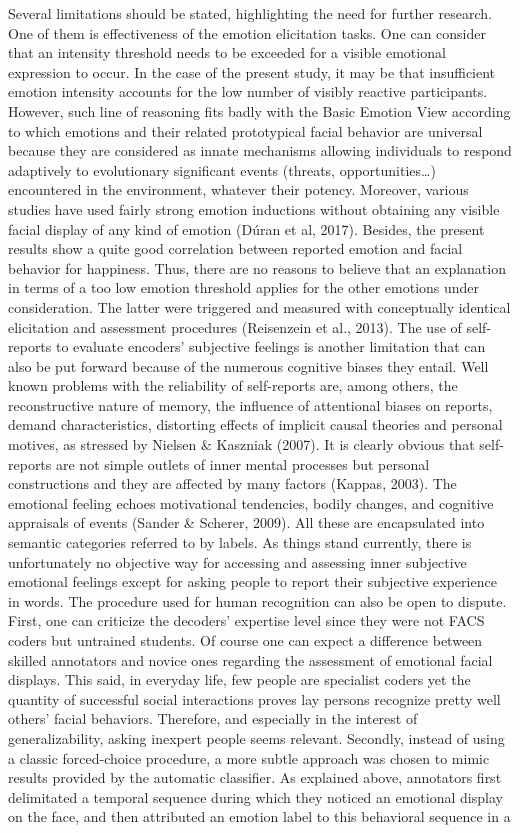 \documentclass[man]{apa6}
\begin{document}
Several limitations should be stated, highlighting the need for further research. One of them is effectiveness of the emotion elicitation tasks. One can consider that an intensity threshold needs to be exceeded for a visible emotional expression to occur. In the case of the present study, it may be that insufficient emotion intensity accounts for the low number of visibly reactive participants. However, such line of reasoning fits badly with the Basic Emotion View according to which emotions and their related prototypical facial behavior are universal because they are considered as innate mechanisms allowing individuals to respond adaptively to evolutionary significant events (threats, opportunities\ldots{}) encountered in the environment, whatever their potency. Moreover, various studies have used fairly strong emotion inductions without obtaining any visible facial display of any kind of emotion (Dúran et al, 2017). Besides, the present results show a quite good correlation between reported emotion and facial behavior for happiness. Thus, there are no reasons to believe that an explanation in terms of a too low emotion threshold applies for the other emotions under consideration. The latter were triggered and measured with conceptually identical elicitation and assessment procedures (Reisenzein et al., 2013). The use of self-reports to evaluate encoders' subjective feelings is another limitation that can also be put forward because of the numerous cognitive biases they entail. Well known problems with the reliability of self-reports are, among others, the reconstructive nature of memory, the influence of attentional biases on reports, demand characteristics, distorting effects of implicit causal theories and personal motives, as stressed by Nielsen \& Kaszniak (2007). It is clearly obvious that self-reports are not simple outlets of inner mental processes but personal constructions and they are affected by many factors (Kappas, 2003). The emotional feeling echoes motivational tendencies, bodily changes, and cognitive appraisals of events (Sander \& Scherer, 2009). All these are encapsulated into semantic categories referred to by labels. As things stand currently, there is unfortunately no objective way for accessing and assessing inner subjective emotional feelings except for asking people to report their subjective experience in words. The procedure used for human recognition can also be open to dispute. First, one can criticize the decoders' expertise level since they were not FACS coders but untrained students. Of course one can expect a difference between skilled annotators and novice ones regarding the assessment of emotional facial displays. This said, in everyday life, few people are specialist coders yet the quantity of successful social interactions proves lay persons recognize pretty well others' facial behaviors. Therefore, and especially in the interest of generalizability, asking inexpert people seems relevant. Secondly, instead of using a classic forced-choice procedure, a more subtle approach was chosen to mimic results provided by the automatic classifier. As explained above, annotators first delimitated a temporal sequence during which they noticed an emotional display on the face, and then attributed an emotion label to this behavioral sequence in a 
\end{document}
